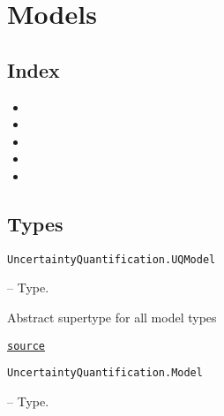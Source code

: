 \section{Models}



\label{3607757037139922397}{}


\subsection{Index}



\label{6663683553518785561}{}

\begin{itemize}
\item {}
\item {}
\item {}
\item {}
\item {}
\end{itemize}


\subsection{Types}



\label{12125088992129103176}{}

\hypertarget{13839731607710581418}{\texttt{UncertaintyQuantification.UQModel}}  -- {Type.}

\begin{adjustwidth}{2em}{0pt}

Abstract supertype for all model types



\href{https://github.com/friesischscott/UncertaintyQuantification.jl/blob/f5ee6cce729f0d6a57979257379c942cdf42f86f/src/UncertaintyQuantification.jl#L36-L38}{\texttt{source}}


\end{adjustwidth}
\hypertarget{10696406664176468523}{\texttt{UncertaintyQuantification.Model}}  -- {Type.}

